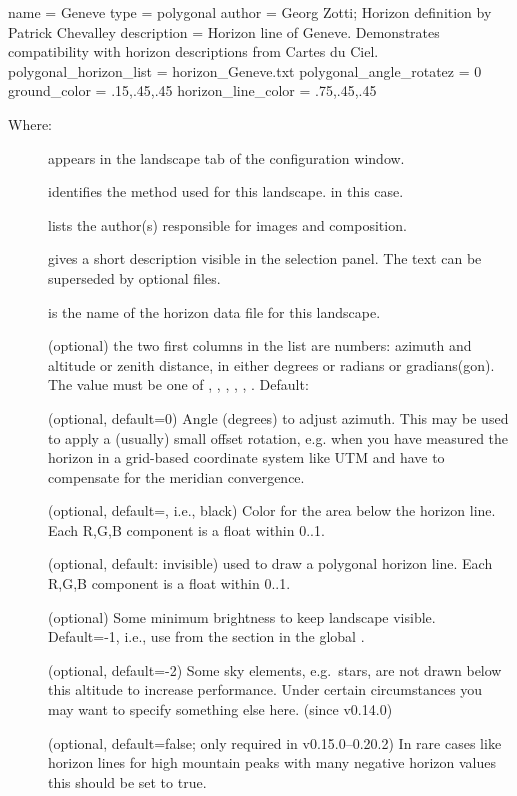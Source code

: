 \begin{configfile}
[landscape]
name = Geneve
type = polygonal
author = Georg Zotti; Horizon definition by Patrick Chevalley
description = Horizon line of Geneve.
              Demonstrates compatibility with
              horizon descriptions from Cartes du Ciel.
polygonal_horizon_list = horizon_Geneve.txt
polygonal_angle_rotatez = 0
ground_color = .15,.45,.45
horizon_line_color = .75,.45,.45
\end{configfile}
%
Where:
\begin{description}
\item[] appears in the landscape tab of the configuration window.
\item[] identifies the method used for this landscape.  in this case.
\item[] lists the author(s) responsible for images and composition.
\item[] gives a short description visible in the
  selection panel. The text can be superseded by optional
   files.
\item[] is the name of the horizon data file for this landscape.
\item[] (optional) the two first
  columns in the list are numbers: azimuth and altitude or zenith
  distance, in either degrees or radians or gradians(gon). The value
  must be one of , , ,
    , , . Default:
\item[] (optional, default=0) Angle
  (degrees) to adjust azimuth. This may be used to apply a (usually)
  small offset rotation, e.g. when you have measured the horizon in a
  grid-based coordinate system like UTM and have to compensate for the
  meridian convergence.
\item[] (optional, default=, i.e.,
  black) Color for the area below the horizon line. Each R,G,B
  component is a float within 0..1.
\item[] (optional, default: invisible) used
  to draw a polygonal horizon line. Each R,G,B component is a float
  within 0..1.
\item[] (optional) Some minimum brightness to
  keep landscape visible. Default=-1, i.e., use
   from the \var{[landscape]} section in the
  global .
\item[] (optional, default=-2) Some sky
  elements, e.g.\ stars, are not drawn below this altitude to increase
  performance. Under certain circumstances you may want to specify
  something else here. (since v0.14.0)
\item[] (optional, default=false;
  only required in v0.15.0--0.20.2) In rare cases like horizon lines
  for high mountain peaks with many negative horizon values this
  should be set to true.
\end{description}

